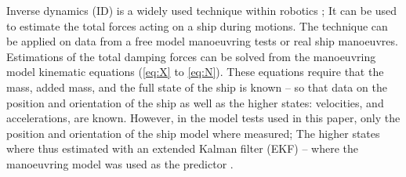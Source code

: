 Inverse dynamics (ID) is a widely used technique within robotics \citep{faber_inverse_2018}; It can be used to estimate the total forces acting on a ship during motions. The technique can be applied on data from a free model manoeuvring tests or real ship manoeuvres. 
Estimations of the total damping forces can be solved from the manoeuvring model kinematic equations  (\autoref{eq:X} to \autoref{eq:N}). These equations require that the mass, added mass, and the full state of the ship is known -- so that data on the position and orientation of the ship as well as the higher states: velocities, and accelerations, are known.
However, in the model tests used in this paper, only the position and orientation of the ship model where measured;
The higher states where thus estimated with an extended Kalman filter (EKF) -- where the manoeuvring model was used as the predictor \citep{alexandersson_wpcc_2022}.

